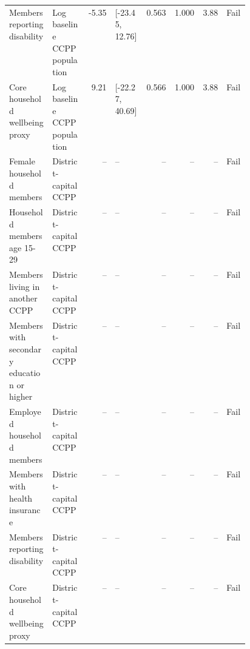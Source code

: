 \begin{longtable}{@{}p{0.18\linewidth}p{0.15\linewidth}rp{0.13\linewidth}rrrl@{}}
Members reporting disability & Log baseline CCPP population & -5.35 & [-23.45, 12.76] & 0.563 & 1.000 & 3.88 & Fail \\
Core household wellbeing proxy & Log baseline CCPP population & 9.21 & [-22.27, 40.69] & 0.566 & 1.000 & 3.88 & Fail \\
Female household members & District-capital CCPP & -- & -- & -- & -- & -- & Fail \\
Household members age 15-29 & District-capital CCPP & -- & -- & -- & -- & -- & Fail \\
Members living in another CCPP & District-capital CCPP & -- & -- & -- & -- & -- & Fail \\
Members with secondary education or higher & District-capital CCPP & -- & -- & -- & -- & -- & Fail \\
Employed household members & District-capital CCPP & -- & -- & -- & -- & -- & Fail \\
Members with health insurance & District-capital CCPP & -- & -- & -- & -- & -- & Fail \\
Members reporting disability & District-capital CCPP & -- & -- & -- & -- & -- & Fail \\
Core household wellbeing proxy & District-capital CCPP & -- & -- & -- & -- & -- & Fail \\
\end{longtable}
\endgroup

